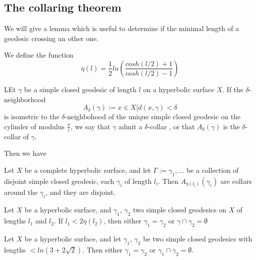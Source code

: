\subsection{The collaring theorem}

We will give a lemma which is useful to determine if the minimal length of a geodesic crossing an other one.

We define the function \[
\eta(l)= \frac{1}{2} ln(\frac{cosh(l/2)+1}{cosh(l/2)-1})
\]

\begin{dfnt}
LEt $\gamma$ be a simple closed geodesic of length $l$ on a hyperbolic surface $X$. If the $\delta$-neighborhood \[
A_\delta(\gamma):={x \in X | d(x,\gamma) < \delta}
\]
is isometric to the $\delta$-neighbohood of the unique simple closed geodesic on the cylinder of modulus $\frac{\pi}{l}$, we say that $\gamma$ admit a $\delta$-collar
, or that $A_\delta(\gamma)$ is the $\delta$-collar of $\gamma$.
\end{dfnt}

Then we have

\begin{thm}
Let $X$ be a complete hyperbolic surface, and let $\Gamma:={\gamma_1,...}$ be a collection of disjoint simple closed geodesic, each $\gamma_i$ of length $l_i$. Then $A_{\eta(l_i)}(\gamma_i)$ are collars around the $\gamma_i$, and they are disjoint.
\end{thm}

\begin{cor}
Let $X$ be a hyperbolic surface, and $\gamma_1$, $\gamma_2$ two simple closed geodesics on $X$ of lengths $l_1$ and $l_2$. If $l_1 < 2 \eta(l_2)$, then either $\gamma_1=\gamma_2$ or $\gamma \cap \gamma_2 = \emptyset$
\end{cor}

\begin{cor}
Let $X$ be a hyperbolic surface, and let $\gamma_1$, $\gamma_2$ be two simple closed geodesics with lengths $< ln(3+2 \sqrt{2})$. Then either $\gamma_1=\gamma_2$ or $\gamma_1 \cap \gamma_2 = \emptyset$.
\end{cor}

